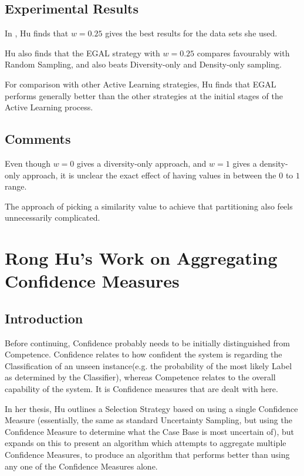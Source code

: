 \documentclass[a4paper,11pt]{report}
\begin{document}
\subsection{Experimental Results}
In \citet{Hu2011}, Hu finds that $w=0.25$ gives the best results for the data sets she used. 

Hu also finds that the EGAL strategy with $w=0.25$ compares favourably with Random Sampling, and also beats Diversity-only and Density-only sampling.

For comparison with other Active Learning strategies, Hu finds that EGAL performs generally better than the other strategies at the initial stages of the Active Learning process.

\subsection{Comments}
Even though $w=0$ gives a diversity-only approach, and $w=1$ gives a density-only approach, it is unclear the exact effect of having values in between the $0$ to $1$ range.

The approach of picking a similarity value to achieve that partitioning also feels unnecessarily complicated.

\section{Rong Hu's Work on Aggregating Confidence Measures}
\subsection{Introduction}
Before continuing, Confidence probably needs to be initially distinguished from Competence. Confidence relates to how confident the system is regarding the Classification of an unseen instance(e.g. the probability of the most likely Label as determined by the Classifier), whereas Competence relates to the overall capability of the system. It is Confidence measures that are dealt with here.

In her thesis\citep{Hu2011}, Hu outlines a Selection Strategy based on using a single Confidence Measure (essentially, the same as standard Uncertainty Sampling, but using the Confidence Measure to determine what the Case Base is most uncertain of), but expands on this to present an algorithm which attempts to aggregate multiple Confidence Measures, to produce an algorithm that performs better than using any one of the Confidence Measures alone.
\end{document}
